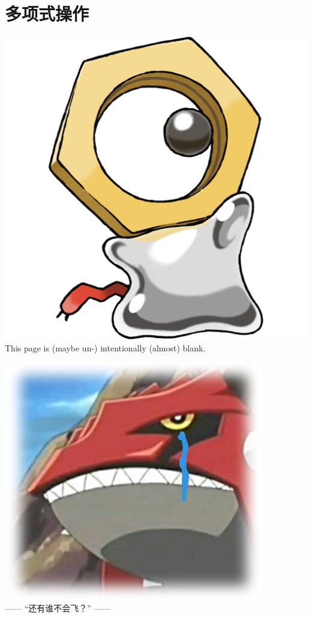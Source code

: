\section{多项式操作}
    \noindent
    \begin{center}
        \vfill
        \vfill
        \includegraphics[scale=0.2]{pictures/Meltan.png}
        \vfill
        This page is (maybe un-) intentionally (almost) blank.
        \vfill
    \end{center}
    

\pagebreak
\hspace{0pt}
\centering
\vfill
\includegraphics[scale=0.4]{pictures/Groudon.jpg}\\[0.4cm]
------ “还有谁不会飞？” ------
\vfill
\hspace{0pt}
\pagebreak
